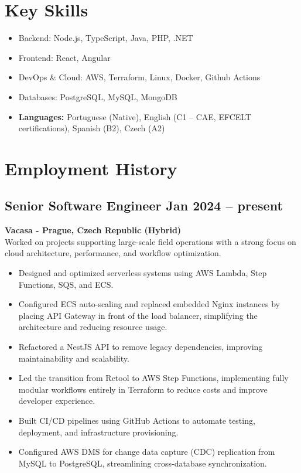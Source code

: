 \documentclass[11pt,a4paper]{article}
\begin{document}
\section*{\faTools\hspace{0.5em}Key Skills}
\begin{itemize}[leftmargin=*]
  \item Backend: Node.js, TypeScript, Java, PHP, .NET
  \item Frontend: React, Angular
  \item DevOps \& Cloud: AWS, Terraform, Linux, Docker, Github Actions
  \item Databases: PostgreSQL, MySQL, MongoDB
  \item \textbf{Languages:} Portuguese (Native), English (C1 – CAE, EFCELT certifications), Spanish (B2), Czech (A2)
\end{itemize}

\section*{\faBriefcase\hspace{0.5em}Employment History}

\subsection*{Senior Software Engineer \hfill Jan 2024 -- present}
\textbf{Vacasa - Prague, Czech Republic (Hybrid)} \\
Worked on projects supporting large-scale field operations with a strong focus on cloud architecture, performance, and workflow optimization.
\begin{itemize}[leftmargin=*]
  \item Designed and optimized serverless systems using AWS Lambda, Step Functions, SQS, and ECS.
  \item Configured ECS auto-scaling and replaced embedded Nginx instances by placing API Gateway in front of the load balancer, simplifying the architecture and reducing resource usage.
  \item Refactored a NestJS API to remove legacy dependencies, improving maintainability and scalability.
  \item Led the transition from Retool to AWS Step Functions, implementing fully modular workflows entirely in Terraform to reduce costs and improve developer experience.
  \item Built CI/CD pipelines using GitHub Actions to automate testing, deployment, and infrastructure provisioning.
  \item Configured AWS DMS for change data capture (CDC) replication from MySQL to PostgreSQL, streamlining cross-database synchronization.
\end{itemize}
\end{document}
